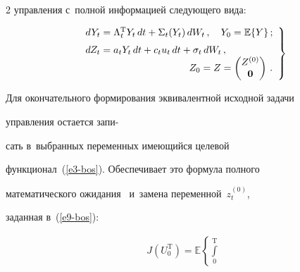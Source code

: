 \begin{multicols}{2}
управления с~полной информацией следующего вида:


     \begin{equation}


     \left.


     \begin{array}{l}


     dY_t=\Lambda_t^{\mathrm{T}} Y_t\,dt+\Sigma_t(Y_t)\,dW_t\,,\quad 


Y_0=\mathbb{E}\{Y\}\,;\\[6pt]


     dZ_t= a_tY_t \,dt+c_t u_t \,dt+ \sigma_t \,dW_t\,,\\ 


\hspace*{37mm}Z_0=Z=\begin{pmatrix}


     Z^{(0)}\\ \mathbf{0}


     \end{pmatrix}\,.


     \end{array}


     \right\}


     \label{e10-bos}


     \end{equation}


     


     Для окончательного формирования эквивалентной исходной задачи 


управления остается запи-\linebreak\vspace*{-12pt}





\columnbreak





\noindent


сать в~выбранных переменных имеющийся целевой 


функционал~(\ref{e3-bos}). Обеспечивает это формула полного 


математического ожидания~\cite{15-bos} и~замена переменной~$z_t^{(0)}$, 


заданная в~(\ref{e9-bos}):


     \begin{multline}


     J(U_0^{\mathrm{T}}) =\mathbb{E}\left\{ \int\limits_0^{\mathrm{T}}



\end{multline}
\end{multicols}
